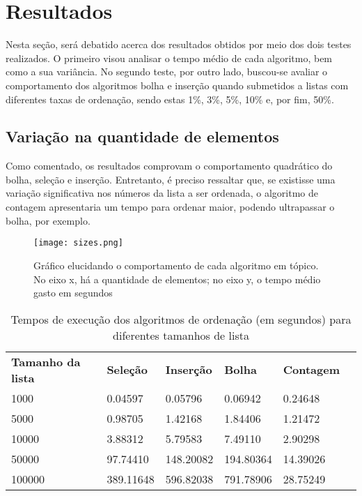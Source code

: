 \section{Resultados}
Nesta seção, será debatido acerca dos resultados obtidos por meio dos dois testes realizados. O primeiro visou analisar o tempo médio de cada algoritmo, bem como a sua variância. 
No segundo teste, por outro lado, buscou-se avaliar o comportamento dos algoritmos bolha e inserção quando submetidos a listas com diferentes taxas de ordenação, sendo estas 1\%, 3\%, 5\%, 10\% e, por fim, 50\%. 


\subsection{Variação na quantidade de elementos}
Como comentado, os resultados comprovam o comportamento quadrático do bolha, seleção e inserção. 
Entretanto, é preciso ressaltar que, se existisse uma variação significativa nos números da lista a ser ordenada, o algoritmo de contagem apresentaria um tempo para ordenar maior, podendo ultrapassar o bolha, por exemplo.

\begin{figure}[h]
    \texttt{[image: sizes.png]}
    \caption{Gráfico elucidando o comportamento de cada algoritmo em tópico. No eixo x, há a quantidade de elementos; no eixo y, o tempo médio gasto em segundos}
    \end{figure}

    \begin{table}[h]
        \begin{tabular}{llllll}
            \textbf{Tamanho da lista} & \textbf{Seleção} & \textbf{Inserção} & \textbf{Bolha} & \textbf{Contagem} \\
            1000 & 0.04597 & 0.05796 & 0.06942 & 0.24648 \\
            5000 & 0.98705 & 1.42168 & 1.84406 & 1.21472 \\
            10000 & 3.88312 & 5.79583 & 7.49110 & 2.90298 \\
            50000 & 97.74410 & 148.20082 & 194.80364 & 14.39026 \\
            100000 & 389.11648 & 596.82038 & 791.78906 & 28.75249 \\
        \end{tabular}
        \caption{Tempos de execução dos algoritmos de ordenação (em segundos) para diferentes tamanhos de lista}
        \label{tab:tempos_algoritmos}
    \end{table}

